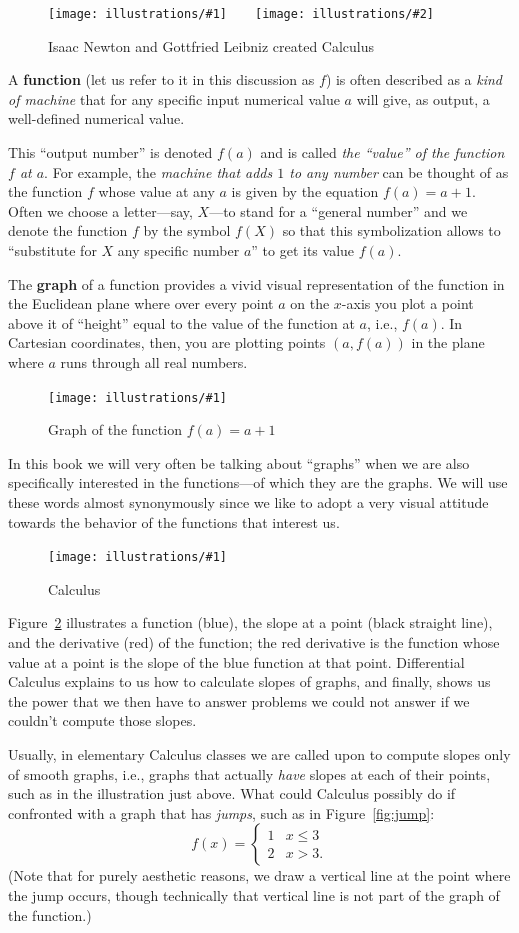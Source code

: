 \documentclass[openany]{book}
\newcommand{\ill}[3]{%
   \begin{figure}[H]%
   \vspace{-2ex}
   \centering%
   \texttt{[image: illustrations/\#1]}%
   \caption{#3}%
   \vspace{-2ex}
    \end{figure}}
\newcommand{\illtwo}[4]{%
   \begin{figure}[H]\centering%
   \texttt{[image: illustrations/\#1]}$\qquad$\texttt{[image: illustrations/\#2]}%
   \caption{#4}%
    \end{figure}}
\theoremstyle{plain}
\theoremstyle{definition}
\begin{document}
 \illtwo{newton}{leibniz}{0.25}{Isaac Newton and Gottfried Leibniz created Calculus}


 A {\bf function} (let us refer to it in this discussion as $f$) is
 often described as a {\it kind of machine} that for any specific
 input numerical value $a$ will give, as output, a well-defined
 numerical value.

 This ``output number'' is denoted $f(a)$ and is called {\it the
   ``value'' of the function $f$ at $a$}.  For example, the {\it
   machine that adds $1$ to any number} can be thought of as the
 function $f$ whose value at any $a$ is given by the equation $f(a) =
 a+1$.  Often we choose a letter---say, $X$---to stand for a ``general
 number'' and we denote the function $f$ by the symbol $f(X)$ so that
 this symbolization allows to ``substitute for $X$ any specific number
 $a$'' to get its value $f(a)$.

 The {\bf graph} of a function provides a vivid visual representation of the
 function in the Euclidean plane where over every point $a$ on the
 $x$-axis you plot a point above it of ``height'' equal to the value of
 the function at $a$, i.e., $f(a)$. In Cartesian coordinates, then,
 you are plotting points $(a, f(a))$ in the plane where $a$ runs
 through all real numbers.

 \ill{graph_aplusone}{0.6}{Graph of the function $f(a)=a+1$\label{fig:graph_aplusone}}

 In this book we will very often be talking about ``graphs'' when we
 are also specifically interested in the functions---of which they are
 the graphs. We will use these words almost synonymously since we like
 to adopt a very visual attitude towards the behavior of the functions
 that interest us.


 \ill{graph_slope_deriv}{0.7}{\label{fig:graph_slope_deriv}Calculus}



 Figure~\ref{fig:graph_slope_deriv} illustrates a function (blue), the
 slope at a point (black straight line), and the derivative (red) of
 the function; the red derivative is the function whose value at a point
 is the slope of the blue function at that point.  Differential
 Calculus explains to us how to calculate slopes of graphs, and
 finally, shows us the power that we then have to answer problems we
 could not answer if we couldn't compute those slopes.

Usually, in elementary Calculus classes we are called upon to compute
slopes only of smooth graphs, i.e., graphs that actually {\em have}
slopes at each of their points, such as in the illustration just
above.  What could Calculus possibly do if confronted with a graph
that has {\em jumps}, such as in Figure~\ref{fig:jump}:
$$f(x) = \begin{cases}1 & x \leq 3\\ 2 & x > 3.\end{cases}$$
(Note that for purely aesthetic reasons, we draw a vertical line at the point where the jump occurs, though technically that vertical line is not part of the graph of the function.)
\end{document}
